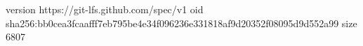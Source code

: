 version https://git-lfs.github.com/spec/v1
oid sha256:bb0cea3fcaafff7eb795be4e34f096236e331818af9d20352f08095d9d552a99
size 6807
